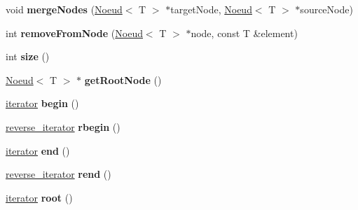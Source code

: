 \begin{DoxyCompactItemize}
\item 
\hypertarget{classBArbre_ade188700cafaaba30bafa917ce5673e2}{
void {\bfseries mergeNodes} (\hyperlink{classNoeud}{Noeud}$<$ T $>$ $\ast$targetNode, \hyperlink{classNoeud}{Noeud}$<$ T $>$ $\ast$sourceNode)}
\label{classBArbre_ade188700cafaaba30bafa917ce5673e2}

\item 
\hypertarget{classBArbre_a19f8e4a34c3548815e12238aa8bbc452}{
int {\bfseries removeFromNode} (\hyperlink{classNoeud}{Noeud}$<$ T $>$ $\ast$node, const T \&element)}
\label{classBArbre_a19f8e4a34c3548815e12238aa8bbc452}

\item 
\hypertarget{classBArbre_a9238a234e0fe293016cff6357854bfd5}{
int {\bfseries size} ()}
\label{classBArbre_a9238a234e0fe293016cff6357854bfd5}

\item 
\hypertarget{classBArbre_a6602cf7c0f6a7f3a7e8c27917e4f54c8}{
\hyperlink{classNoeud}{Noeud}$<$ T $>$ $\ast$ {\bfseries getRootNode} ()}
\label{classBArbre_a6602cf7c0f6a7f3a7e8c27917e4f54c8}

\item 
\hypertarget{classBArbre_abc6be6012c8d0ff48cdf6e67337de03e}{
\hyperlink{classBArbre_1_1iterator}{iterator} {\bfseries begin} ()}
\label{classBArbre_abc6be6012c8d0ff48cdf6e67337de03e}

\item 
\hypertarget{classBArbre_ad0de78fea4611cc9a6f4d2992a6fc899}{
\hyperlink{classBArbre_1_1reverse__iterator}{reverse\_\-iterator} {\bfseries rbegin} ()}
\label{classBArbre_ad0de78fea4611cc9a6f4d2992a6fc899}

\item 
\hypertarget{classBArbre_a09d28b28bf01b215b8dbe7f9a0a5a55b}{
\hyperlink{classBArbre_1_1iterator}{iterator} {\bfseries end} ()}
\label{classBArbre_a09d28b28bf01b215b8dbe7f9a0a5a55b}

\item 
\hypertarget{classBArbre_a0190a3b190f9dac6bfeda51f69732f20}{
\hyperlink{classBArbre_1_1reverse__iterator}{reverse\_\-iterator} {\bfseries rend} ()}
\label{classBArbre_a0190a3b190f9dac6bfeda51f69732f20}

\item 
\hypertarget{classBArbre_a572ecf896ce181b96ec235a559a50017}{
\hyperlink{classBArbre_1_1iterator}{iterator} {\bfseries root} ()}
\label{classBArbre_a572ecf896ce181b96ec235a559a50017}

\end{DoxyCompactItemize}
